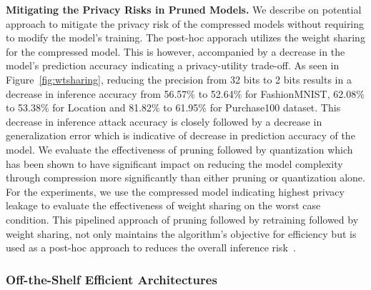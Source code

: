 \textbf{Mitigating the Privacy Risks in Pruned Models.} We describe on potential approach to mitigate the privacy risk of the compressed models without requiring to modify the model's training.
The post-hoc apporach utilizes the weight sharing for the compressed model. This is however, accompanied by a decrease in the model's prediction accuracy indicating a privacy-utility trade-off.
As seen in Figure~\ref{fig:wtsharing}, reducing the precision from 32 bits to 2 bits results in a decrease in inference accuracy from 56.57\% to 52.64\% for FashionMNIST, 62.08\% to 53.38\% for Location and 81.82\% to 61.95\% for Purchase100 dataset.
This decrease in inference attack accuracy is closely followed by a decrease in generalization error which is indicative of decrease in prediction accuracy of the model.
We evaluate the effectiveness of pruning followed by quantization which has been shown to have significant impact on reducing the model complexity through compression more significantly than either pruning or quantization alone.
For the experiments, we use the compressed model indicating highest privacy leakage to evaluate the effectiveness of weight sharing on the worst case condition.
This pipelined approach of pruning followed by retraining followed by weight sharing, not only maintains the algorithm's objective for efficiency but is used as a post-hoc approach to reduces the overall inference risk~\cite{DBLP:journals/corr/HanMD15,DBLP:journals/corr/HanPNMTECTD16}.






\subsubsection{Off-the-Shelf Efficient Architectures}



